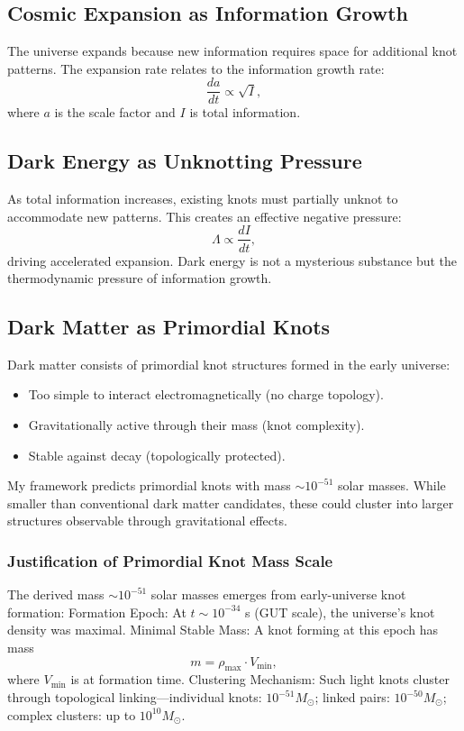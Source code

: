 \documentclass{article}
\begin{document}
\subsection{Cosmic Expansion as Information Growth}
The universe expands because new information requires space for additional knot patterns. The expansion rate relates to the information growth rate:
\[
\frac{da}{dt} \propto \sqrt{I},
\]
where $a$ is the scale factor and $I$ is total information.

\subsection{Dark Energy as Unknotting Pressure}
As total information increases, existing knots must partially unknot to accommodate new patterns. This creates an effective negative pressure:
\[
\Lambda \propto \frac{dI}{dt},
\]
driving accelerated expansion. Dark energy is not a mysterious substance but the thermodynamic pressure of information growth.

\subsection{Dark Matter as Primordial Knots}
Dark matter consists of primordial knot structures formed in the early universe:
\begin{itemize}
\item Too simple to interact electromagnetically (no charge topology).
\item Gravitationally active through their mass (knot complexity).
\item Stable against decay (topologically protected).
\end{itemize}
My framework predicts primordial knots with mass $\sim 10^{-51}$ solar masses. While smaller than conventional dark matter candidates, these could cluster into larger structures observable through gravitational effects.

\subsubsection{Justification of Primordial Knot Mass Scale}
The derived mass $\sim 10^{-51}$ solar masses emerges from early-universe knot formation:  
Formation Epoch: At $t \sim 10^{-34}$ s (GUT scale), the universe's knot density was maximal.  
Minimal Stable Mass: A knot forming at this epoch has mass  
\[
m = \rho_{\max} \cdot V_{\min},
\]
where $V_{\min}$ is at formation time.  
Clustering Mechanism: Such light knots cluster through topological linking—individual knots: $10^{-51} M_\odot$; linked pairs: $10^{-50} M_\odot$; complex clusters: up to $10^{10} M_\odot$.  
\end{document}
